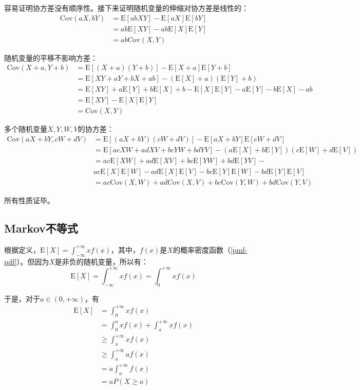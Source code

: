 \documentclass[UTF8]{ctexbook}
\begin{document}
容易证明协方差没有顺序性。接下来证明随机变量的伸缩对协方差是线性的：
\begin{align*}
	\mathrm{Cov}(aX,bY)&=\mathrm E[abXY]-\mathrm E[aX]\mathrm E[bY] \\
	&=ab\mathrm E[XY]-ab\mathrm E[X]\mathrm E[Y] \\
	&=ab\mathrm{Cov}(X, Y)
\end{align*}

随机变量的平移不影响方差：
\begin{align*}
	\mathrm{Cov}(X+a,Y+b)&=\mathrm E[(X+a)(Y+b)]-\mathrm E[X+a]\mathrm E[Y+b] \\
	&=\mathrm E[XY+aY+bX+ab]-(\mathrm E[X]+a)(\mathrm E[Y]+b) \\
	&=\mathrm E[XY]+a\mathrm E[Y]+b\mathrm E[X]+b-\mathrm E[X]\mathrm E[Y]-a\mathrm E[Y]-b\mathrm E[X]-ab \\
	&=\mathrm E[XY]-\mathrm E[X]\mathrm E[Y] \\
	&=\mathrm{Cov}(X, Y)
\end{align*}

多个随机变量$X,Y,W,V$的协方差：
\begin{align*}
	\mathrm{Cov}(aX+bY,cW+dV)&=\mathrm E[(aX+bY)(cW+dV)]-\mathrm E[aX+bY]\mathrm E[cW+dV] \\
	&=\mathrm E[acXW+adXV+bcYW+bdYV]-(a\mathrm E[X]+b\mathrm E[Y])(c\mathrm E[W]+d\mathrm E[V]) \\
	&=ac\mathrm E[XW]+ad\mathrm E[XV]+bc\mathrm E[YW]+bd\mathrm E[YV]- \\
	&ac\mathrm E[X]\mathrm E[W]-ad\mathrm E[X]\mathrm E[V]-bc\mathrm E[Y]\mathrm E[W]-bd\mathrm E[Y]\mathrm E[V] \\
	&=ac\mathrm{Cov}(X, W)+ad\mathrm{Cov}(X, V)+bc\mathrm{Cov}(Y, W)+bd\mathrm{Cov}(Y, V)
\end{align*}

所有性质证毕。

\subsection{Markov不等式}
\label{markov-inequality-proof}
根据定义，$\mathrm E[X]=\int_{-\infty}^{+\infty}xf(x)$，其中，$f(x)$是$X$的概率密度函数（\ref{pmf-pdf}）。但因为$X$是非负的随机变量，所以有：
\[
	\mathrm E[X]=\int_{-\infty}^{+\infty}xf(x)=\int_{0}^{+\infty}xf(x)
\]

于是，对于$a\in(0,+\infty)$，有
\begin{align*}
	\mathrm E[X]&=\int_{0}^{+\infty}xf(x) \\
	&=\int_{0}^{a}xf(x)+\int_{a}^{+\infty}xf(x) \\
	&\geq\int_{a}^{+\infty}xf(x) \\
	&\geq\int_{a}^{+\infty}af(x) \\
	&=a\int_{a}^{+\infty}f(x) \\
	&=aP(X\geq a)
\end{align*}
\end{document}
